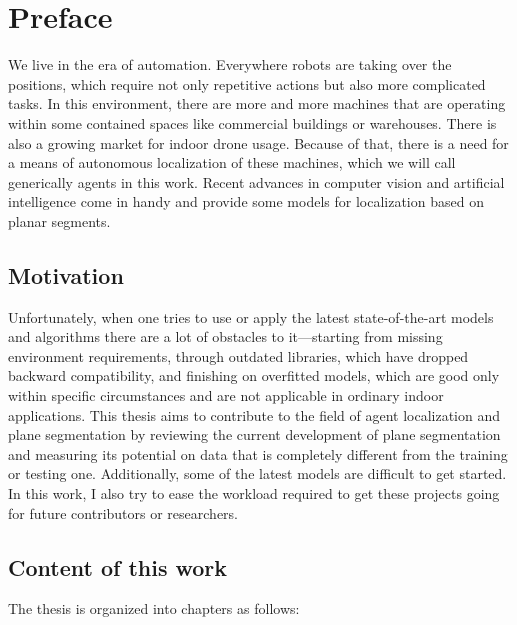 
\chapter{Preface}

We live in the era of automation.
Everywhere robots are taking over the positions, which require not only repetitive actions but also more complicated tasks.
In this environment, there are more and more machines that are operating within some contained spaces like commercial buildings or warehouses.
There is also a growing market for indoor drone usage.
Because of that, there is a need for a means of autonomous localization of these machines, which we will call generically agents in this work.
Recent advances in computer vision and artificial intelligence come in handy and provide some models for localization based on planar segments.

\section{Motivation}

Unfortunately, when one tries to use or apply the latest state-of-the-art models and algorithms there are a lot of obstacles to it—starting from
missing environment requirements, through outdated libraries, which have dropped backward compatibility,
and finishing on overfitted models, which are good only within specific circumstances and are not applicable in ordinary indoor applications.
This thesis aims to contribute to the field of agent localization and plane segmentation
by reviewing the current development of plane segmentation and measuring its potential on data
that is completely different from the training or testing one.
Additionally, some of the latest models are difficult to get started.
In this work, I also try to ease the workload required to get these projects going for future contributors or researchers.

\section{Content of this work}

The thesis is organized into chapters as follows:

